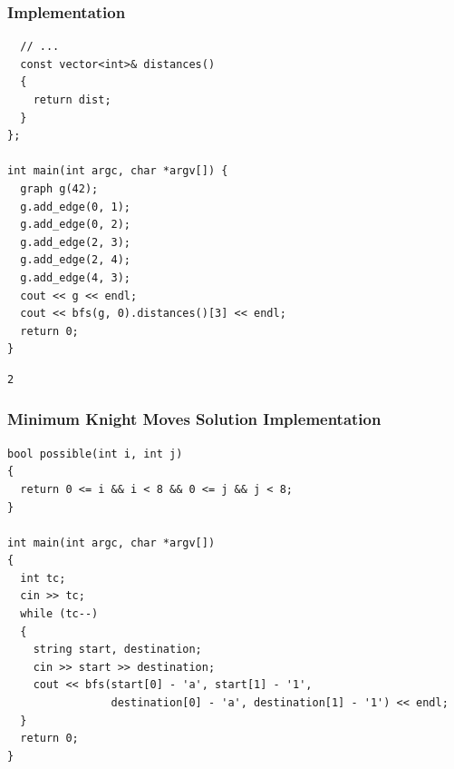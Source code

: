 \documentclass{beamer}
\newcommand{\uvalink}[2]{UVa Online Judge (http://uva.onlinejudge.org)
  problem number \href{#2}{\textcolor{blue}{#1}.}}
\newcommand{\spojlink}[2]{Sphere Online Judge (http://www.spoj.com)
  problem: \href{#2}{\textcolor{blue}{#1}.}}
\newcounter{exo}
\newcommand{\exo}{
  \addtocounter{exo}{1}
  Exercice \arabic{exo}
}
\begin{document}
\begin{frame}[containsverbatim]
\frametitle{Implementation}
\scriptsize
\begin{lstlisting}
  // ...
  const vector<int>& distances()
  {
    return dist;
  }
};

int main(int argc, char *argv[]) {
  graph g(42);
  g.add_edge(0, 1);
  g.add_edge(0, 2);
  g.add_edge(2, 3);
  g.add_edge(2, 4);
  g.add_edge(4, 3);
  cout << g << endl;
  cout << bfs(g, 0).distances()[3] << endl;
  return 0;
}
\end{lstlisting}

\begin{verbatim}
2
\end{verbatim}

\end{frame}


\ifanswers

\begin{frame}[containsverbatim]
\frametitle{Minimum Knight Moves Solution Implementation}
\scriptsize
\begin{lstlisting}
bool possible(int i, int j)
{
  return 0 <= i && i < 8 && 0 <= j && j < 8;
}

int main(int argc, char *argv[])
{
  int tc;
  cin >> tc;
  while (tc--)
  {
    string start, destination;
    cin >> start >> destination;
    cout << bfs(start[0] - 'a', start[1] - '1',
                destination[0] - 'a', destination[1] - '1') << endl;
  }
  return 0;
}
\end{lstlisting}

\end{frame}
\end{document}
